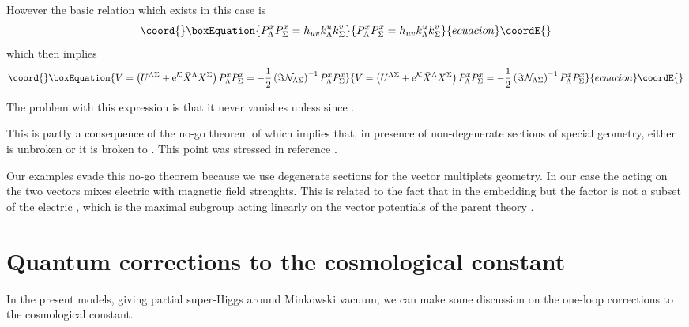\documentclass[a4paper,12pt]{article}
\begin{document}
However the basic relation which exists in this case is \cite{agata}
\begin{equation}\coord{}\boxEquation{
P^x_\Lambda P^x_\Sigma = h_{uv} k^u_\Lambda k^v_\Sigma
}{
P^x_\Lambda P^x_\Sigma = h_{uv} k^u_\Lambda k^v_\Sigma
}{ecuacion}\coordE{}\end{equation}
which then implies
\begin{equation}\coord{}\boxEquation{
V = \left(U^{\Lambda \Sigma} + {\rm e}^{\mathcal K}\bar X^\Lambda  X^\Sigma\right)P^x_\Lambda P^x_\Sigma = -\frac 12 \left(
\Im {\mathcal N}_{\Lambda\Sigma}\right)^{-1} P^x_\Lambda P^x_\Sigma
}{
V = \left(U^{\Lambda \Sigma} + {\rm e}^{\mathcal K}\bar X^\Lambda  X^\Sigma\right)P^x_\Lambda P^x_\Sigma = -\frac 12 \left(
\Im {\mathcal N}_{\Lambda\Sigma}\right)^{-1} P^x_\Lambda P^x_\Sigma
}{ecuacion}\coordE{}\end{equation}

The problem with this expression is that it never vanishes unless \coordHE{} since \coordHE{}.

This is partly a consequence of the no-go theorem of \cite{cgp2} which implies that, in presence of non-degenerate sections \coordHE{} of
special geometry, either \coordHE{} is unbroken or it is broken to \coordHE{}. This point was stressed in reference \cite{mayr}.

Our examples evade this no-go theorem because we use degenerate sections for the vector multiplets geometry.
In our case the \coordHE{} acting on the two vectors mixes electric with magnetic field strenghts.
This is related to the fact that in the embedding \coordHE{} but the \coordHE{} factor 
is not a subset of the electric
\coordHE{}, which is the maximal subgroup  acting linearly on the vector potentials
 of the parent \coordHE{} theory \cite{adfl3, dfv}.


\section{Quantum corrections to the cosmological constant}

In the present models, giving partial super-Higgs around Minkowski vacuum, we can make some discussion on the one-loop 
corrections to the cosmological constant.
\end{document}
